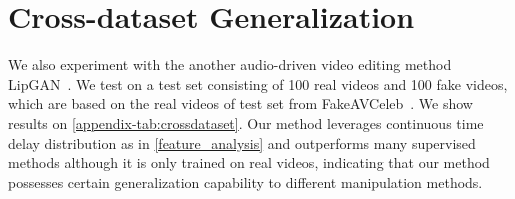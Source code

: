 \documentclass[10pt,twocolumn,letterpaper]{article}
\begin{document}
\section{Cross-dataset Generalization}
\label{appendix:crossdataset}
We also experiment with the another audio-driven video editing method LipGAN~\cite{kr2019towards}. We test on a test set consisting of 100 real videos and 100 fake videos, which are based on the real videos of test set from FakeAVCeleb~\cite{NEURIPS_DATASETS_AND_BENCHMARKS2021_d9d4f495}. We show results on \cref{appendix-tab:crossdataset}. Our method leverages continuous time delay distribution as in \cref{feature_analysis} and outperforms many supervised methods although it is only trained on real videos, indicating that our method possesses certain generalization capability to different manipulation methods. 
\end{document}
